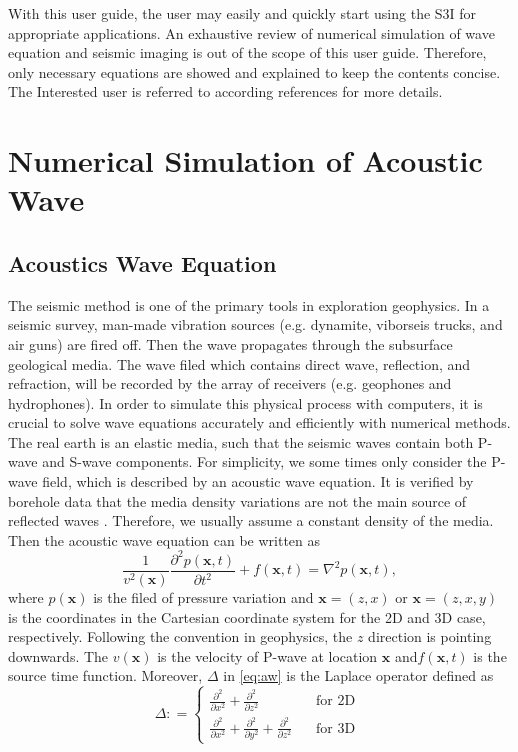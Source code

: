 \documentclass[11pt,titlepage]{article}
\newcommand{\bx}{\boldsymbol{x}}
\theoremstyle{plain}
\theoremstyle{definition}
\theoremstyle{remark}
\numberwithin{equation}{section}
\begin{document}
With this user guide, the user may easily and quickly start using the S3I for appropriate applications. An exhaustive review of numerical simulation of wave equation and seismic imaging is out of the scope of this user guide. Therefore, only necessary equations are showed and explained to keep the contents concise. The Interested user is referred to according references for more details.  



\section{Numerical Simulation of Acoustic Wave}


\subsection{Acoustics Wave Equation}
The seismic method is one of the primary tools in exploration geophysics. In a seismic survey, man-made vibration sources (e.g. dynamite, viborseis trucks, and air guns) are fired off. Then the wave propagates through the subsurface geological media. The wave filed which contains direct wave, reflection, and refraction, will be recorded by the array of receivers (e.g. geophones and hydrophones). In order to simulate this physical process with computers, it is crucial to solve wave equations accurately and efficiently with numerical methods. The real earth is an elastic media, such that the seismic waves contain both P-wave and S-wave components. For simplicity, we some times only consider the P-wave field, which is described by an acoustic wave equation. It is verified by borehole data that the media density variations are not the main source of reflected waves \cite{Hood:1981aa}. Therefore, we usually assume a constant density of the media. Then the acoustic wave equation can be written as
\begin{equation}\label{eq:aw}
\frac{1}{v^2(\bx)}\frac{\partial^2 p(\bx, t)}{\partial t^2} + f(\bx, t) = \nabla^2 p(\bx, t),
\end{equation}
where $p(\bx)$ is the filed of pressure variation and $\bx=(z,x)$ or $\bx=(z,x,y)$ is the coordinates in the Cartesian coordinate system for the 2D and 3D case, respectively. Following the convention in geophysics, the $z$ direction is pointing downwards. The $v(\bx)$ is the velocity of P-wave at location $\bx$ and$f(\bx,t)$ is the source time function. Moreover, $\Delta$ in \eqref{eq:aw} is the Laplace operator defined as 
\begin{equation}
\Delta: =\left\{
\begin{aligned}
\frac{\partial^2}{\partial x^2}+\frac{\partial^2}{\partial z^2}~~~~~~~ & ~~~~\text{for 2D }\\
\frac{\partial^2}{\partial x^2}+\frac{\partial^2}{\partial y^2}+\frac{\partial^2}{\partial z^2} &~~~~ \text{for 3D}
\end{aligned}
\right.  
\end{equation}
\end{document}

